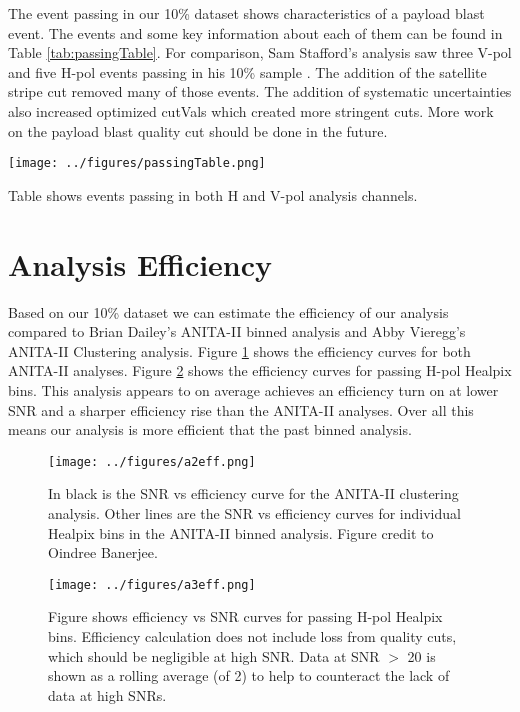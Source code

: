 The event passing in our 10\% dataset shows characteristics of a payload blast event. The events and some key information about each of them can be found in Table \ref{tab:passingTable}. For comparison, Sam Stafford's analysis saw three V-pol and five H-pol events passing in his 10\% sample \cite{sam}. The addition of the satellite stripe cut removed many of those events. The addition of systematic uncertainties also increased optimized cutVals which created more stringent cuts.  More work on the payload blast quality cut should be done in the future.

\begin{table}[h]
\centering
\texttt{[image: ../figures/passingTable.png]}
\caption[Passing Events Table, 10\% dataset]{Table shows events passing in both H and V-pol analysis channels.}
\label{tab:passingTable}
\end{table}

\section{Analysis Efficiency}


Based on our 10\% dataset we can estimate the efficiency of our analysis compared to Brian Dailey's ANITA-II binned analysis and Abby Vieregg's ANITA-II Clustering analysis.  Figure \ref{fig:A2eff} shows the efficiency curves for both ANITA-II analyses.  Figure \ref{fig:A3eff} shows the efficiency curves for passing H-pol Healpix bins.  This analysis appears to on average achieves an efficiency turn on at lower SNR and a sharper efficiency rise than the ANITA-II analyses.  Over all this means our analysis is more efficient that the past binned analysis.

\begin{figure}[h]
\centering
\texttt{[image: ../figures/a2eff.png]}
\caption[ANITA-II Analysis Efficiency]{In black is the SNR vs efficiency curve for the ANITA-II clustering analysis.  Other lines are the SNR vs efficiency curves for individual Healpix bins in the ANITA-II binned analysis.  Figure credit to Oindree Banerjee.}
\label{fig:A2eff}
\end{figure}

\begin{figure}[h]
\centering
\texttt{[image: ../figures/a3eff.png]}
\caption[ANITA-III Binned Analysis Efficiency]{Figure shows efficiency vs SNR curves for passing H-pol Healpix bins.  Efficiency calculation does not include loss from quality cuts, which should be negligible at high SNR.  Data at SNR $>$ 20 is shown as a rolling average (of 2) to help to counteract the lack of data at high SNRs.}
\label{fig:A3eff}
\end{figure}

